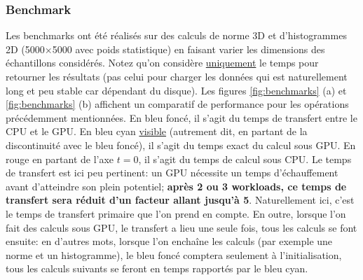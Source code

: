 \documentclass[13pt, a4paper]{extarticle}
\begin{document}
\subsubsection{Benchmark}\label{sec:benchmark}
\noindent Les benchmarks ont été réalisés sur des calculs de norme 3D et 
d'histogrammes 2D (5000$\times$5000 avec poids statistique) 
en faisant varier les dimensions des échantillons considérés. Notez qu'on considère \ul{uniquement} 
le temps pour retourner les résultats (pas celui pour charger les données 
qui est naturellement long et peu stable car dépendant du disque). Les figures \ref{fig:benchmarks} (a)
et \ref{fig:benchmarks} (b) affichent un comparatif de performance pour les opérations précédemment
mentionnées. En bleu foncé, il s'agit du temps de transfert entre le CPU et le GPU. 
En bleu cyan \ul{visible} (autrement dit, en partant de la discontinuité avec 
le bleu foncé), il s'agit du temps exact du calcul sous GPU. En rouge en partant de l'axe $t=0$,
il s'agit du temps de calcul sous CPU. Le temps de transfert est ici peu pertinent:
un GPU nécessite un temps d'échauffement avant d'atteindre son plein potentiel;
{\bf après 2 ou 3 workloads, ce temps de transfert sera réduit d'un facteur allant jusqu'à 5}.
Naturellement ici, c'est le temps de transfert primaire que l'on prend en compte.
En outre, lorsque l'on fait des calculs sous GPU, le transfert a lieu une seule fois,
tous les calculs se font ensuite: en d'autres mots, lorsque l'on enchaîne les calculs
(par exemple une norme et un histogramme),
le bleu foncé comptera seulement à l'initialisation, tous les calculs suivants 
se feront en temps rapportés par le bleu cyan. 
\end{document}

